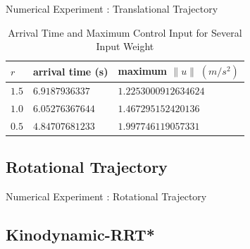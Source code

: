 \documentclass{beamer}
\begin{document}
\begin{frame}{Numerical Experiment : Translational Trajectory}
\begin{table}[]
\caption{Arrival Time and Maximum Control Input for Several Input Weight}
\label{trajectories_table}
\centering
\begin{tabular}{|l|l|l|}
\hline
$r$ & arrival time (s) & maximum $\| u \| \; (m/s^2)$ \\ \hline
$1.5$ & $6.9187936337$ & $1.2253000912634624$ \\ \hline
$1.0$ & $6.05276367644$ & $1.467295152420136$ \\ \hline
$0.5$ & $4.84707681233$ & $1.997746119057331$ \\ \hline
\end{tabular}
\end{table}
\end{frame}

\subsection{Rotational Trajectory}
\begin{frame}{Numerical Experiment : Rotational Trajectory}
\begin{table}[ht]
\caption{Arrival Time}
\label{arrival_time}
\centering
{}
\end{table}
\end{frame}

\subsection{Kinodynamic-RRT*}
\end{document}

